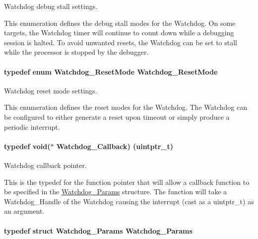 Watchdog debug stall settings. 

This enumeration defines the debug stall modes for the Watchdog. On some targets, the Watchdog timer will continue to count down while a debugging session is halted. To avoid unwanted resets, the Watchdog can be set to stall while the processor is stopped by the debugger. 
\paragraph[{Watchdog\+\_\+\+Reset\+Mode}]{\setlength{\rightskip}{0pt plus 5cm}typedef enum {\bf Watchdog\+\_\+\+Reset\+Mode}  {\bf Watchdog\+\_\+\+Reset\+Mode}}\label{_watchdog_8h_a49befb9cfb12eb30c8832809bcbaa3a4}


Watchdog reset mode settings. 

This enumeration defines the reset modes for the Watchdog. The Watchdog can be configured to either generate a reset upon timeout or simply produce a periodic interrupt. 
\paragraph[{Watchdog\+\_\+\+Callback}]{\setlength{\rightskip}{0pt plus 5cm}typedef void($\ast$ Watchdog\+\_\+\+Callback) (uintptr\+\_\+t)}\label{_watchdog_8h_abb9d5f385013e9950884200d8d05fd05}


Watchdog callback pointer. 

This is the typedef for the function pointer that will allow a callback function to be specified in the \hyperlink{struct_watchdog___params}{Watchdog\+\_\+\+Params} structure. The function will take a Watchdog\+\_\+\+Handle of the Watchdog causing the interrupt (cast as a uintptr\+\_\+t) as an argument. 
\paragraph[{Watchdog\+\_\+\+Params}]{\setlength{\rightskip}{0pt plus 5cm}typedef struct {\bf Watchdog\+\_\+\+Params}  {\bf Watchdog\+\_\+\+Params}}\label{_watchdog_8h_a001003d331ef831675e9a8388a81041c}


